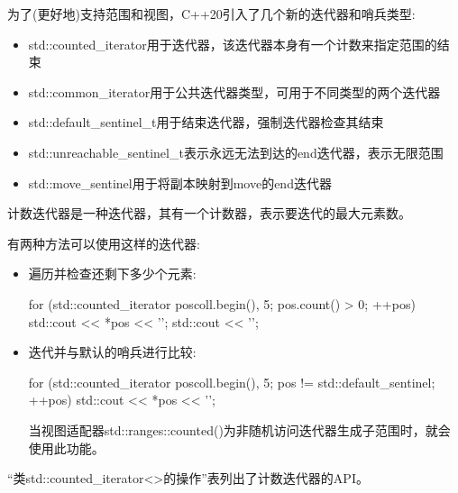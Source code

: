 
为了(更好地)支持范围和视图，C++20引入了几个新的迭代器和哨兵类型:

\begin{itemize}
\item
std::counted\_iterator用于迭代器，该迭代器本身有一个计数来指定范围的结束

\item
std::common\_iterator用于公共迭代器类型，可用于不同类型的两个迭代器

\item
std::default\_sentinel\_t用于结束迭代器，强制迭代器检查其结束

\item
std::unreachable\_sentinel\_t表示永远无法到达的end迭代器，表示无限范围

\item
std::move\_sentinel用于将副本映射到move的end迭代器
\end{itemize}


计数迭代器是一种迭代器，其有一个计数器，表示要迭代的最大元素数。

有两种方法可以使用这样的迭代器:

\begin{itemize}
\item
遍历并检查还剩下多少个元素:

\begin{cpp}
for (std::counted_iterator pos{coll.begin(), 5}; pos.count() > 0; ++pos) {
	std::cout << *pos << '\n';
}
std::cout << '\n';
\end{cpp}

\item
迭代并与默认的哨兵进行比较:

\begin{cpp}
for (std::counted_iterator pos{coll.begin(), 5};
pos != std::default_sentinel; ++pos) {
	std::cout << *pos << '\n';
}
\end{cpp}

当视图适配器std::ranges::counted()为非随机访问迭代器生成子范围时，就会使用此功能。
\end{itemize}

“类std::counted\_iterator<>的操作”表列出了计数迭代器的API。

